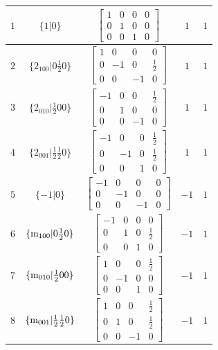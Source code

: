 \documentclass[fleqn,8pt]{jsarticle}
\begin{document}
\begin{longtable}{ccccc}
$ 1 $ & $ \{1|0\} $ & $ \begin{bmatrix} 1 & 0 & 0 & 0 \\ 0 & 1 & 0 & 0 \\ 0 & 0 & 1 & 0 \end{bmatrix} $ & $ 1 $ & $ 1 $ \\ \hline
$ 2 $ & $ \{2{}_{100}|0 \frac{1}{2} 0\} $ & $ \begin{bmatrix} 1 & 0 & 0 & 0 \\ 0 & -1 & 0 & \frac{1}{2} \\ 0 & 0 & -1 & 0 \end{bmatrix} $ & $ 1 $ & $ 1 $ \\ \hline
$ 3 $ & $ \{2{}_{010}|\frac{1}{2} 0 0\} $ & $ \begin{bmatrix} -1 & 0 & 0 & \frac{1}{2} \\ 0 & 1 & 0 & 0 \\ 0 & 0 & -1 & 0 \end{bmatrix} $ & $ 1 $ & $ 1 $ \\ \hline
$ 4 $ & $ \{2{}_{001}|\frac{1}{2} \frac{1}{2} 0\} $ & $ \begin{bmatrix} -1 & 0 & 0 & \frac{1}{2} \\ 0 & -1 & 0 & \frac{1}{2} \\ 0 & 0 & 1 & 0 \end{bmatrix} $ & $ 1 $ & $ 1 $ \\ \hline
$ 5 $ & $ \{-1|0\} $ & $ \begin{bmatrix} -1 & 0 & 0 & 0 \\ 0 & -1 & 0 & 0 \\ 0 & 0 & -1 & 0 \end{bmatrix} $ & $ -1 $ & $ 1 $ \\ \hline
$ 6 $ & $ \{{\rm m}_{100}|0 \frac{1}{2} 0\} $ & $ \begin{bmatrix} -1 & 0 & 0 & 0 \\ 0 & 1 & 0 & \frac{1}{2} \\ 0 & 0 & 1 & 0 \end{bmatrix} $ & $ -1 $ & $ 1 $ \\ \hline
$ 7 $ & $ \{{\rm m}_{010}|\frac{1}{2} 0 0\} $ & $ \begin{bmatrix} 1 & 0 & 0 & \frac{1}{2} \\ 0 & -1 & 0 & 0 \\ 0 & 0 & 1 & 0 \end{bmatrix} $ & $ -1 $ & $ 1 $ \\ \hline
$ 8 $ & $ \{{\rm m}_{001}|\frac{1}{2} \frac{1}{2} 0\} $ & $ \begin{bmatrix} 1 & 0 & 0 & \frac{1}{2} \\ 0 & 1 & 0 & \frac{1}{2} \\ 0 & 0 & -1 & 0 \end{bmatrix} $ & $ -1 $ & $ 1 $ \\ \hline

\end{longtable}
\end{document}
